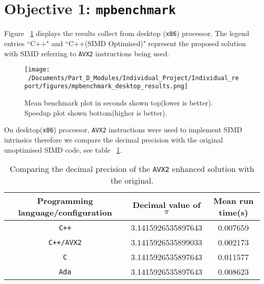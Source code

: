 \section{Objective 1: \texttt{mpbenchmark}}

Figure ~\ref{fig:mpbenchmark_desktop_plot} displays the results collect from desktop (\texttt{x86}) processor. The legend entries ``C++" and ``C++(SIMD Optimised)" represent the proposed solution with SIMD referring to \texttt{AVX2} instructions being used. 

\begin{figure}[htbp] %
	\centering
	\texttt{[image: ~/Documents/Part\_D\_Modules/Individual\_Project/Individual\_report/figures/mpbenchmark\_desktop\_results.png]} %
	\caption{Mean benchmark plot in seconds shown top(lower is better). Speedup plot shown bottom(higher is better).}
	\label{fig:mpbenchmark_desktop_plot} %
\end{figure}


On desktop(\texttt{x86}) processor, \texttt{AVX2} instructions were used to implement SIMD intrinsics therefore we compare the decimal precision with the original unoptimised SIMD code, see table ~\ref{tab:c++_avx2_pi}.

\begin{table}[htbp]
	\centering
	\begin{tabular}{|c|c|c|}
		\hline
		\textbf{Programming language/configuration} & \textbf{Decimal value of $\pi$} & \textbf{Mean run time(s)} \\ \hline
		\texttt{C++}             & 3.1415926535897643 &  0.007659 \\ \hline
		\texttt{C++/AVX2}   & 3.1415926535899033 &  0.002173  \\ \hline
		\texttt{C}                 & 3.1415926535897643 & 0.011577 \\ \hline
		\texttt{Ada}             & 3.1415926535897643 &  0.008623\\ \hline
	\end{tabular}
	\label{tab:c++_avx2_pi}
	\caption{Comparing the decimal precision of the \texttt{AVX2} enhanced solution with the original.}
\end{table}


